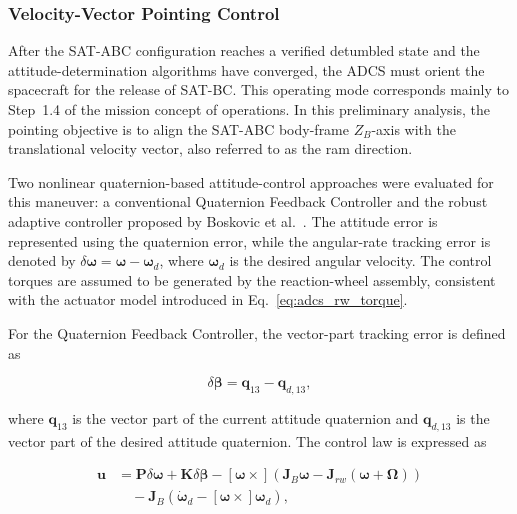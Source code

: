 \subsubsection{Velocity-Vector Pointing Control}
\label{subsub:adcs_satabc_pointing}

After the SAT-ABC configuration reaches a verified detumbled state and the attitude-determination algorithms have converged, the ADCS must orient the spacecraft for the release of SAT-BC. This operating mode corresponds mainly to Step~1.4 of the mission concept of operations. In this preliminary analysis, the pointing objective is to align the SAT-ABC body-frame \(Z_B\)-axis with the translational velocity vector, also referred to as the ram direction.

Two nonlinear quaternion-based attitude-control approaches were evaluated for this maneuver: a conventional Quaternion Feedback Controller and the robust adaptive controller proposed by Boskovic et al.~\cite{Boskovic2004}. The attitude error is represented using the quaternion error, while the angular-rate tracking error is denoted by \(\delta\boldsymbol{\omega} = \boldsymbol{\omega} - \boldsymbol{\omega}_{d}\), where \(\boldsymbol{\omega}_{d}\) is the desired angular velocity. The control torques are assumed to be generated by the reaction-wheel assembly, consistent with the actuator model introduced in Eq.~\eqref{eq:adcs_rw_torque}.

For the Quaternion Feedback Controller, the vector-part tracking error is defined as

\begin{equation}
    \delta\boldsymbol{\beta}
    =
    \mathbf{q}_{13}
    -
    \mathbf{q}_{d,13},
    \label{eq:adcs_satabc_quaternion_vector_error}
\end{equation}

where \(\mathbf{q}_{13}\) is the vector part of the current attitude quaternion and \(\mathbf{q}_{d,13}\) is the vector part of the desired attitude quaternion. The control law is expressed as

\begin{equation}
\begin{aligned}
    \mathbf{u}
    &=
    \mathbf{P}\delta\boldsymbol{\omega}
    +
    \mathbf{K}\delta\boldsymbol{\beta}
    -
    [\boldsymbol{\omega}\times]
    \left(
        \mathbf{J}_{B}\boldsymbol{\omega}
        -
        \mathbf{J}_{rw}
        \left(
            \boldsymbol{\omega}
            +
            \boldsymbol{\Omega}
        \right)
    \right) \\
    &\quad
    -
    \mathbf{J}_{B}
    \left(
        \dot{\boldsymbol{\omega}}_{d}
        -
        [\boldsymbol{\omega}\times]\boldsymbol{\omega}_{d}
    \right),
\end{aligned}
\label{eq:adcs_satabc_quaternion_feedback_control}
\end{equation}

